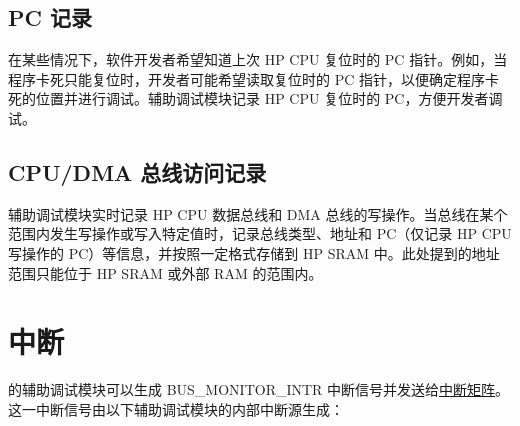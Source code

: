 \documentclass[main\_\_CN.tex]{subfiles}
\begin{document}
\subsection{PC 记录}

在某些情况下，软件开发者希望知道上次 HP CPU 复位时的 PC 指针。例如，当程序卡死只能复位时，开发者可能希望读取复位时的 PC 指针，以便确定程序卡死的位置并进行调试。辅助调试模块记录 HP CPU 复位时的 PC，方便开发者调试。

\subsection{CPU/DMA 总线访问记录}

辅助调试模块实时记录 HP CPU 数据总线和 DMA 总线的写操作。当总线在某个范围内发生写操作或写入特定值时，记录总线类型、地址和 PC（仅记录 HP CPU 写操作的 PC）等信息，并按照一定格式存储到 HP SRAM 中。此处提到的地址范围只能位于 HP SRAM 或外部 RAM 的范围内。


\section{中断}
\label{sec:dbgassist-interrupts}

\chipname{} 的辅助调试模块可以生成 BUS\_MONITOR\_INTR 中断信号并发送给\hyperref[mod:intmtrx]{中断矩阵}。这一中断信号由以下辅助调试模块的内部中断源生成：
\end{document}
